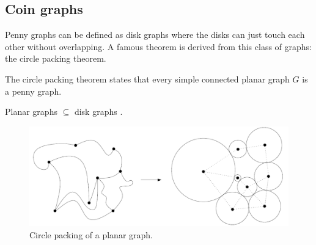 \subsection{Coin graphs}

Penny graphs can be defined as disk graphs where the disks can just touch each
other without overlapping. A famous theorem is derived from this class of graphs:
the circle packing theorem.

\begin{theorem}
  The circle packing theorem states that every simple connected planar graph
  $G$ is a penny graph. \cite{doi:10.1137/0406017}
\end{theorem}

\begin{corollary}
  Planar graphs $\subseteq$ disk graphs \cite{spinradEfficientGraphRepresentations2012}.
\end{corollary}

\begin{figure}
\centering
\includegraphics[width=1.0\textwidth]{res/circle_packing}
\caption{Circle packing of a planar graph. \cite{nachmiasPlanarMapsRandom2016}}
\label{fig:circle}
\end{figure}
